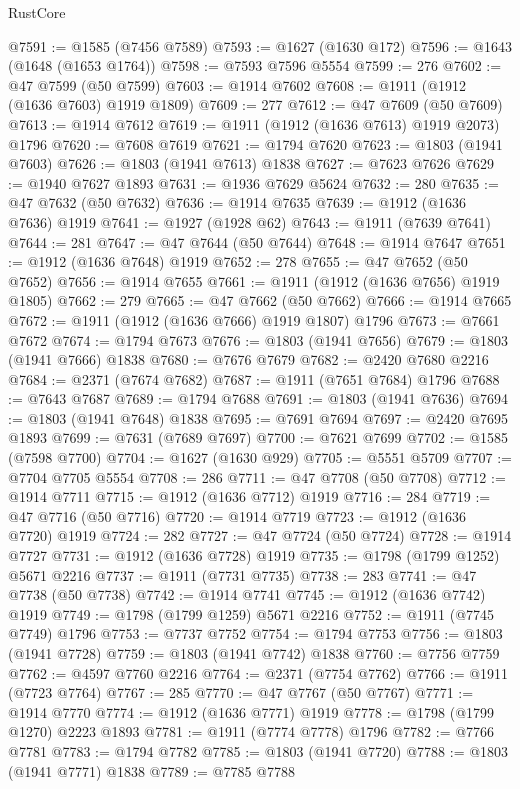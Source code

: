 \begin{lexlean}{RustCore}
\begin{coremodule}
@7591 := @1585 (@7456 @7589)
@7593 := @1627 (@1630 @172)
@7596 := @1643 (@1648 (@1653 @1764))
@7598 := @7593 @7596 @5554
@7599 := 276
@7602 := @47 @7599 (@50 @7599)
@7603 := @1914 @7602
@7608 := @1911 (@1912 (@1636 @7603) @1919 @1809)
@7609 := 277
@7612 := @47 @7609 (@50 @7609)
@7613 := @1914 @7612
@7619 := @1911 (@1912 (@1636 @7613) @1919 @2073) @1796
@7620 := @7608 @7619
@7621 := @1794 @7620
@7623 := @1803 (@1941 @7603)
@7626 := @1803 (@1941 @7613) @1838
@7627 := @7623 @7626
@7629 := @1940 @7627 @1893
@7631 := @1936 @7629 @5624
@7632 := 280
@7635 := @47 @7632 (@50 @7632)
@7636 := @1914 @7635
@7639 := @1912 (@1636 @7636) @1919
@7641 := @1927 (@1928 @62)
@7643 := @1911 (@7639 @7641)
@7644 := 281
@7647 := @47 @7644 (@50 @7644)
@7648 := @1914 @7647
@7651 := @1912 (@1636 @7648) @1919
@7652 := 278
@7655 := @47 @7652 (@50 @7652)
@7656 := @1914 @7655
@7661 := @1911 (@1912 (@1636 @7656) @1919 @1805)
@7662 := 279
@7665 := @47 @7662 (@50 @7662)
@7666 := @1914 @7665
@7672 := @1911 (@1912 (@1636 @7666) @1919 @1807) @1796
@7673 := @7661 @7672
@7674 := @1794 @7673
@7676 := @1803 (@1941 @7656)
@7679 := @1803 (@1941 @7666) @1838
@7680 := @7676 @7679
@7682 := @2420 @7680 @2216
@7684 := @2371 (@7674 @7682)
@7687 := @1911 (@7651 @7684) @1796
@7688 := @7643 @7687
@7689 := @1794 @7688
@7691 := @1803 (@1941 @7636)
@7694 := @1803 (@1941 @7648) @1838
@7695 := @7691 @7694
@7697 := @2420 @7695 @1893
@7699 := @7631 (@7689 @7697)
@7700 := @7621 @7699
@7702 := @1585 (@7598 @7700)
@7704 := @1627 (@1630 @929)
@7705 := @5551 @5709
@7707 := @7704 @7705 @5554
@7708 := 286
@7711 := @47 @7708 (@50 @7708)
@7712 := @1914 @7711
@7715 := @1912 (@1636 @7712) @1919
@7716 := 284
@7719 := @47 @7716 (@50 @7716)
@7720 := @1914 @7719
@7723 := @1912 (@1636 @7720) @1919
@7724 := 282
@7727 := @47 @7724 (@50 @7724)
@7728 := @1914 @7727
@7731 := @1912 (@1636 @7728) @1919
@7735 := @1798 (@1799 @1252) @5671 @2216
@7737 := @1911 (@7731 @7735)
@7738 := 283
@7741 := @47 @7738 (@50 @7738)
@7742 := @1914 @7741
@7745 := @1912 (@1636 @7742) @1919
@7749 := @1798 (@1799 @1259) @5671 @2216
@7752 := @1911 (@7745 @7749) @1796
@7753 := @7737 @7752
@7754 := @1794 @7753
@7756 := @1803 (@1941 @7728)
@7759 := @1803 (@1941 @7742) @1838
@7760 := @7756 @7759
@7762 := @4597 @7760 @2216
@7764 := @2371 (@7754 @7762)
@7766 := @1911 (@7723 @7764)
@7767 := 285
@7770 := @47 @7767 (@50 @7767)
@7771 := @1914 @7770
@7774 := @1912 (@1636 @7771) @1919
@7778 := @1798 (@1799 @1270) @2223 @1893
@7781 := @1911 (@7774 @7778) @1796
@7782 := @7766 @7781
@7783 := @1794 @7782
@7785 := @1803 (@1941 @7720)
@7788 := @1803 (@1941 @7771) @1838
@7789 := @7785 @7788

\end{coremodule}
\end{lexlean}
